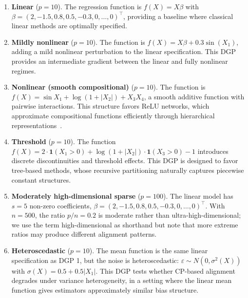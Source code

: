 \documentclass[pdflatex,sn-mathphys-ay]{sn-jnl}%
\theoremstyle{thmstyleone}%
\theoremstyle{thmstyletwo}%
\theoremstyle{thmstylethree}%
\begin{document}
\begin{enumerate}
    \item \textbf{Linear} ($p=10$). The regression function is $f(X) = X\beta$ with $\beta = (2,\allowbreak -1.5,\allowbreak 0.8,\allowbreak 0.5,\allowbreak -0.3,\allowbreak 0,\allowbreak \ldots,\allowbreak 0)^\top$, providing a baseline where classical linear methods are optimally specified.

    \item \textbf{Mildly nonlinear} ($p=10$). The function is $f(X) = X\beta + 0.3\sin(X_1)$, adding a mild nonlinear perturbation to the linear specification. This DGP provides an intermediate gradient between the linear and fully nonlinear regimes.

    \item \textbf{Nonlinear (smooth compositional)} ($p=10$). The function is $f(X) = \sin X_1 + \log(1 + |X_2|) + X_3X_4$, a smooth additive function with pairwise interactions. This structure favors ReLU networks, which approximate compositional functions efficiently through hierarchical representations~\citep{schmidt2020}.

    \item \textbf{Threshold} ($p=10$). The function $f(X) = 2 \cdot \mathbf{1}(X_1 > 0) + \log(1 + |X_2|) \cdot \mathbf{1}(X_3 > 0) - 1$ introduces discrete discontinuities and threshold effects. This DGP is designed to favor tree-based methods, whose recursive partitioning naturally captures piecewise constant structures.

    \item \textbf{Moderately high-dimensional sparse} ($p=100$). The linear model has $s = 5$ non-zero coefficients, $\beta = (2,\allowbreak -1.5,\allowbreak 0.8,\allowbreak 0.5,\allowbreak -0.3,\allowbreak 0,\allowbreak \ldots,\allowbreak 0)^\top$. With $n=500$, the ratio $p/n = 0.2$ is moderate rather than ultra-high-dimensional; we use the term high-dimensional as shorthand but note that more extreme ratios may produce different alignment patterns.

    \item \textbf{Heteroscedastic} ($p=10$). The mean function is the same linear specification as DGP 1, but the noise is heteroscedastic: $\varepsilon \sim N(0, \sigma^2(X))$ with $\sigma(X) = 0.5 + 0.5|X_1|$. This DGP tests whether CP-based alignment degrades under variance heterogeneity, in a setting where the linear mean function gives estimators approximately similar bias structure.
\end{enumerate}
\end{document}
